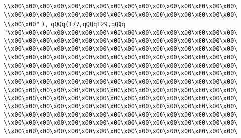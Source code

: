 \verb|\\x00\x00\x00\x00\x00\x00\x00\x00\x00\x00\x00\x00\x00\x00\x00\x00\|\newline
\verb|\\x00\x00\x00\x00\x00\x00\x00\x00\x00\x00\x00\x00\x00\x00\x00\x00\|\newline
\verb|\\x00\x00"|\newline
\verb|),|\newline
\verb|qQQq(177,qQQq129,qQQq|\newline
\verb|"\x00\x00\x00\x00\x00\x00\x00\x00\x00\x00\x00\x00\x00\x00\x00\x00\|\newline
\verb|\\x00\x00\x00\x00\x00\x00\x00\x00\x00\x00\x00\x00\x00\x00\x00\x00\|\newline
\verb|\\x00\x00\x00\x00\x00\x00\x00\x00\x00\x00\x00\x00\x00\x00\x00\x00\|\newline
\verb|\\x00\x00\x00\x00\x00\x00\x00\x00\x00\x00\x00\x00\x00\x00\x00\x00\|\newline
\verb|\\x00\x00\x00\x00\x00\x00\x00\x00\x00\x00\x00\x00\x00\x00\x00\x00\|\newline
\verb|\\x00\x00\x00\x00\x00\x00\x00\x00\x00\x00\x00\x00\x00\x00\x00\x00\|\newline
\verb|\\x00\x00\x00\x00\x00\x00\x00\x00\x00\x00\x00\x00\x00\x00\x00\x00\|\newline
\verb|\\x00\x00\x00\x00\x00\x00\x00\x00\x00\x00\x00\x00\x00\x00\x00\x00\|\newline
\verb|\\x00\x00\x00\x00\x00\x00\x00\x00\x00\x00\x00\x00\x00\x00\x00\x00\|\newline
\verb|\\x00\x00\x00\x00\x00\x00\x00\x00\x00\x00\x00\x00\x00\x00\x00\x00\|\newline
\verb|\\x00\x00\x00\x00\x00\x00\x00\x00\x00\x00\x00\x00\x00\x00\x00\x00\|\newline
\verb|\\x00\x00\x00\x00\x00\x00\x00\x00\x00\x00\x00\x00\x00\x00\x00\x00\|\newline
\verb|\\x00\x00\x00\x00\x00\x00\x00\x00\x00\x00\x00\x00\x00\x00\x00\x00\|\newline

